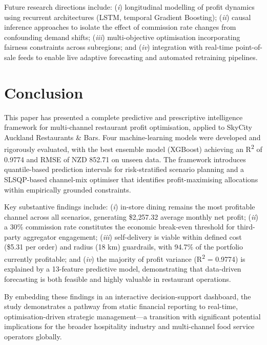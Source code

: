 \documentclass[10pt,a4paper,twocolumn]{article}
\begin{document}
Future research directions include: (\textit{i}) longitudinal modelling of profit
dynamics using recurrent architectures (LSTM, temporal Gradient Boosting);
(\textit{ii}) causal inference approaches to isolate the effect of commission rate
changes from confounding demand shifts; (\textit{iii}) multi-objective optimisation
incorporating fairness constraints across subregions; and (\textit{iv}) integration
with real-time point-of-sale feeds to enable live adaptive forecasting and automated
retraining pipelines.

\section{Conclusion}
\label{sec:conclusion}

This paper has presented a complete predictive and prescriptive intelligence framework
for multi-channel restaurant profit optimisation, applied to SkyCity Auckland
Restaurants \& Bars. Four machine-learning models were developed and rigorously
evaluated, with the best ensemble model (XGBoost) achieving an R\textsuperscript{2}
of 0.9774 and RMSE of NZD 852.71 on unseen data. The framework introduces quantile-based
prediction intervals for risk-stratified scenario planning and a SLSQP-based channel-mix
optimiser that identifies profit-maximising allocations within empirically grounded
constraints.

Key substantive findings include: (\textit{i}) in-store dining remains the most
profitable channel across all scenarios, generating \$2{,}257.32 average monthly net
profit; (\textit{ii}) a 30\% commission rate constitutes the economic break-even
threshold for third-party aggregator engagement; (\textit{iii}) self-delivery is viable
within defined cost (\$5.31 per order) and radius (18 km) guardrails, with 94.7\% of
the portfolio currently profitable; and (\textit{iv}) the majority of profit variance
(R\textsuperscript{2} = 0.9774) is explained by a 13-feature predictive model,
demonstrating that data-driven forecasting is both feasible and highly valuable in
restaurant operations.

By embedding these findings in an interactive decision-support dashboard, the study
demonstrates a pathway from static financial reporting to real-time, optimisation-driven
strategic management—a transition with significant potential implications for the
broader hospitality industry and multi-channel food service operators globally.
\end{document}

